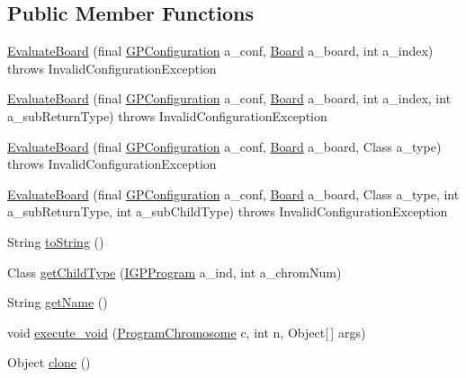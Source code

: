 \subsection*{Public Member Functions}
\begin{DoxyCompactItemize}
\item 
\hyperlink{classexamples_1_1gp_1_1tictactoe_1_1_evaluate_board_a2875c8f13fc63d08f54e9d5d6dd1eae7}{Evaluate\-Board} (final \hyperlink{classorg_1_1jgap_1_1gp_1_1impl_1_1_g_p_configuration}{G\-P\-Configuration} a\-\_\-conf, \hyperlink{classexamples_1_1gp_1_1tictactoe_1_1_board}{Board} a\-\_\-board, int a\-\_\-index)  throws Invalid\-Configuration\-Exception 
\item 
\hyperlink{classexamples_1_1gp_1_1tictactoe_1_1_evaluate_board_afb7ac8376a86bb0cc6a3b008d96ac198}{Evaluate\-Board} (final \hyperlink{classorg_1_1jgap_1_1gp_1_1impl_1_1_g_p_configuration}{G\-P\-Configuration} a\-\_\-conf, \hyperlink{classexamples_1_1gp_1_1tictactoe_1_1_board}{Board} a\-\_\-board, int a\-\_\-index, int a\-\_\-sub\-Return\-Type)  throws Invalid\-Configuration\-Exception 
\item 
\hyperlink{classexamples_1_1gp_1_1tictactoe_1_1_evaluate_board_a69394178c477fdd7fbe8f63985d670b3}{Evaluate\-Board} (final \hyperlink{classorg_1_1jgap_1_1gp_1_1impl_1_1_g_p_configuration}{G\-P\-Configuration} a\-\_\-conf, \hyperlink{classexamples_1_1gp_1_1tictactoe_1_1_board}{Board} a\-\_\-board, Class a\-\_\-type)  throws Invalid\-Configuration\-Exception 
\item 
\hyperlink{classexamples_1_1gp_1_1tictactoe_1_1_evaluate_board_a879de8c03774fa912d9d28e815b0f6e7}{Evaluate\-Board} (final \hyperlink{classorg_1_1jgap_1_1gp_1_1impl_1_1_g_p_configuration}{G\-P\-Configuration} a\-\_\-conf, \hyperlink{classexamples_1_1gp_1_1tictactoe_1_1_board}{Board} a\-\_\-board, Class a\-\_\-type, int a\-\_\-sub\-Return\-Type, int a\-\_\-sub\-Child\-Type)  throws Invalid\-Configuration\-Exception 
\item 
String \hyperlink{classexamples_1_1gp_1_1tictactoe_1_1_evaluate_board_a92cf44697b9ddf2f42a9377c19573704}{to\-String} ()
\item 
Class \hyperlink{classexamples_1_1gp_1_1tictactoe_1_1_evaluate_board_a8661fcc93e3e2d912bac40fb0e383ec0}{get\-Child\-Type} (\hyperlink{interfaceorg_1_1jgap_1_1gp_1_1_i_g_p_program}{I\-G\-P\-Program} a\-\_\-ind, int a\-\_\-chrom\-Num)
\item 
String \hyperlink{classexamples_1_1gp_1_1tictactoe_1_1_evaluate_board_ab2bfbc12e92f4e197943efe9b0a09ceb}{get\-Name} ()
\item 
void \hyperlink{classexamples_1_1gp_1_1tictactoe_1_1_evaluate_board_abece9125d9ee8fb48cf6aa5a96af7c0a}{execute\-\_\-void} (\hyperlink{classorg_1_1jgap_1_1gp_1_1impl_1_1_program_chromosome}{Program\-Chromosome} c, int n, Object\mbox{[}$\,$\mbox{]} args)
\item 
Object \hyperlink{classexamples_1_1gp_1_1tictactoe_1_1_evaluate_board_a45ded6636062706ec78f4ddd227f1393}{clone} ()
\end{DoxyCompactItemize}
